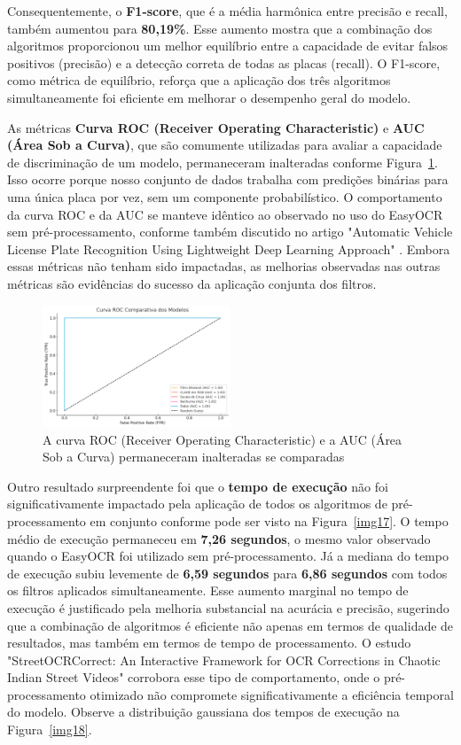 \documentclass[conference]{IEEEtran}
\begin{document}
Consequentemente, o \textbf{F1-score}, que é a média harmônica entre precisão e recall, também aumentou para \textbf{80,19\%}. Esse aumento mostra que a combinação dos algoritmos proporcionou um melhor equilíbrio entre a capacidade de evitar falsos positivos (precisão) e a detecção correta de todas as placas (recall). O F1-score, como métrica de equilíbrio, reforça que a aplicação dos três algoritmos simultaneamente foi eficiente em melhorar o desempenho geral do modelo.

As métricas \textbf{Curva ROC (Receiver Operating Characteristic)} e \textbf{AUC (Área Sob a Curva)}, que são comumente utilizadas para avaliar a capacidade de discriminação de um modelo, permaneceram inalteradas conforme Figura~\ref{img19}. Isso ocorre porque nosso conjunto de dados trabalha com predições binárias para uma única placa por vez, sem um componente probabilístico. O comportamento da curva ROC e da AUC se manteve idêntico ao observado no uso do EasyOCR sem pré-processamento, conforme também discutido no artigo "Automatic Vehicle License Plate Recognition Using Lightweight Deep Learning Approach" \cite{b5}. Embora essas métricas não tenham sido impactadas, as melhorias observadas nas outras métricas são evidências do sucesso da aplicação conjunta dos filtros.

\begin{figure}[htbp]
    \centerline{\includegraphics[width=0.5\textwidth]{img19.png}}
    \caption{A curva ROC (Receiver Operating Characteristic) e a AUC (Área Sob a Curva) permaneceram inalteradas se comparadas}
    \label{img19}
\end{figure}

Outro resultado surpreendente foi que o \textbf{tempo de execução} não foi significativamente impactado pela aplicação de todos os algoritmos de pré-processamento em conjunto conforme pode ser visto na Figura~\ref{img17}. O tempo médio de execução permaneceu em \textbf{7,26 segundos}, o mesmo valor observado quando o EasyOCR foi utilizado sem pré-processamento. Já a mediana do tempo de execução subiu levemente de \textbf{6,59 segundos} para \textbf{6,86 segundos} com todos os filtros aplicados simultaneamente. Esse aumento marginal no tempo de execução é justificado pela melhoria substancial na acurácia e precisão, sugerindo que a combinação de algoritmos é eficiente não apenas em termos de qualidade de resultados, mas também em termos de tempo de processamento. O estudo "StreetOCRCorrect: An Interactive Framework for OCR Corrections in Chaotic Indian Street Videos" \cite{b13} corrobora esse tipo de comportamento, onde o pré-processamento otimizado não compromete significativamente a eficiência temporal do modelo. Observe a distribuição gaussiana dos tempos de execução na Figura~\ref{img18}.
\end{document}
